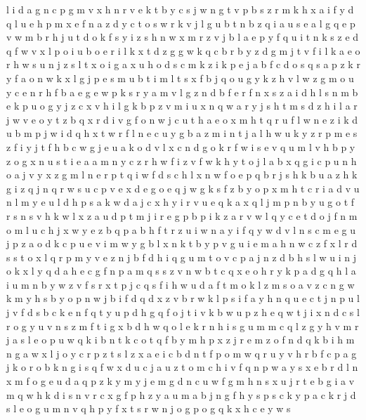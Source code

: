 \documentclass{article}
\begin{document}
l i d a g n c p
g m
v
x
h n r v e k t b y c s
j w n g t v p b s z r m k h x a i f y d q l u e
h p m x e f n a z d y c t o s w r k v j l g u b
t n b z q i a u s e
a l g q e p v w m b r h j u t d o k f s y i z
s h n w x m r z v j b l a e p y f q u i
t n k s z e d q f w v x l p o i u
b o e r i l k x t d z g
g w k q c b r
b y z d g m j t v f i l k a e o r h w s u n
j z s l t x o i g a
x u h o d s c m k
z i k p e j a b f c d o s
q s a p z k r y f
a o n w k x l g j p e s m u b t i
m l t s x f b j q
o u g y k z h v l w
z g m o u y c e n r
h f b a e g
e w p k s r y a m v l g z n d b f
e r f n x s z a i d h
l s n m b e k p u o g y j z c x v h i
l g k b p z v m i u x n q w a r y j s h t
m s d z h i l a r j w v e o y t
z b q x r d i v g f o n w j c u t h a e
o x m h t q r u f l w n e z i k
d u b m p
j w
i d q h x t w r f l n e c u y g b a z m
i n t j a l h w u k y z r p m e
s z f i y j
t f h b c w g j e u a k o d v l
x c n d g o k r f w i s e v q u m l
v h b p y z o g x n u s t i e a
a m n y c z r
h w f i
z v f w k h y t o j l a b x q g i c p u n
h o a j v y x z g m l n e r p t q i w f d s c
h l x n w f o e p q b r
j s h k b
u a z h
k g i z q j
n
q r w s u c p v e
x d e g o
e q j w g k s f z b y o p x m h t c r i a d v u n l
m y e u l d h p s a k w
d a j c x h y i r v u e q
k a x q l j m p n b y u g o t f r s
n s v h k w l x z a u d p t m j i r e
g p
b p i k z a r v w l q y c e t d o j f n m
o m l u c h j x w y e z b q p a
b h f t r z u i w n a y
i f q y w d v l n s c m e g u j p z a o
d k c p u e v i m w y g b l x n
k t b y p v g u i e m a h n w c z f x l r d s
s t o x l q r p m y v e z n j b f d h i
q g u m t o v c p a j n z d b h s l
w u i n j o k x l y q d a h e c g f
n p a m q s
s z v n w b t c q x e o h r y k p a d g
q h l a i u m n b y w z v f s r x t p j c
q s f i
h w u d a f t m o k l z
m s
o a v z c n g w k m y h s
b
y o p n w j b i f d q
d x z v b r w k l p s i f a y h n q u e c t j
n p u l j v f d s b
c k e n f q t y u p d
h g q f o j t i v k b w u p
z h
e q w t j i x n d c s l r o g
y u v n s z m f t i g x b d h w q o l e k
r
n h i s g u m
m c q l
z g y h v m r j a s l e o p u w q k i b n t
k c o t q f b y m h
p x z j r e m
z o f n d
q k b i h m n g a w x l j o y c r p z t
s l z x a e i c b d n t f p o m w q r u y v
h r b f c p a g j k o
r o b k n g i s q f w x d u c j a
u z t o m c h i v f q n p w a y s x e b r d l
n x m f o g e u d a q p z k y
m
y j e m g d n c u
w f g m h n
s x u j r t e b g i a v m q w h k
d
i s n v r c x g f p h z y a
u m a b j n g f h y s p
s c k y p
a c k r j d s l e o g u m n v q h p y f x t
s r w n j
o g
p o g q k x h c e y w s
\end{document}
